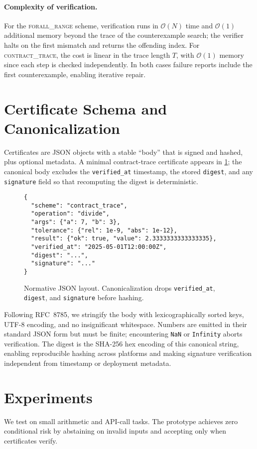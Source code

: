 \documentclass[11pt]{article}
\begin{document}
\paragraph{Complexity of verification.}
For the \textsc{forall\_range} scheme, verification runs in $\mathcal{O}(N)$ time and $\mathcal{O}(1)$ additional memory beyond the trace of the counterexample search; the verifier halts on the first mismatch and returns the offending index. For \textsc{contract\_trace}, the cost is linear in the trace length $T$, with $\mathcal{O}(1)$ memory since each step is checked independently. In both cases failure reports include the first counterexample, enabling iterative repair.

\section{Certificate Schema and Canonicalization}
Certificates are JSON objects with a stable ``body'' that is signed and hashed, plus optional metadata. A minimal contract-trace certificate appears in \cref{fig:json-schema}; the canonical body excludes the \texttt{verified\_at} timestamp, the stored \texttt{digest}, and any \texttt{signature} field so that recomputing the digest is deterministic.

\begin{figure}[t]
\centering
\begin{verbatim}
{
  "scheme": "contract_trace",
  "operation": "divide",
  "args": {"a": 7, "b": 3},
  "tolerance": {"rel": 1e-9, "abs": 1e-12},
  "result": {"ok": true, "value": 2.3333333333333335},
  "verified_at": "2025-05-01T12:00:00Z",
  "digest": "...",
  "signature": "..."
}
\end{verbatim}
\caption{Normative JSON layout. Canonicalization drops \texttt{verified\_at}, \texttt{digest}, and \texttt{signature} before hashing.}
\label{fig:json-schema}
\end{figure}

Following RFC~8785, we stringify the body with lexicographically sorted keys, UTF-8 encoding, and no insignificant whitespace. Numbers are emitted in their standard JSON form but must be finite; encountering \texttt{NaN} or \texttt{Infinity} aborts verification. The digest is the SHA-256 hex encoding of this canonical string, enabling reproducible hashing across platforms and making signature verification independent from timestamp or deployment metadata.

\section{Experiments}
We test on small arithmetic and API-call tasks. The prototype achieves zero conditional risk by abstaining on invalid inputs and accepting only when certificates verify.
\end{document}
